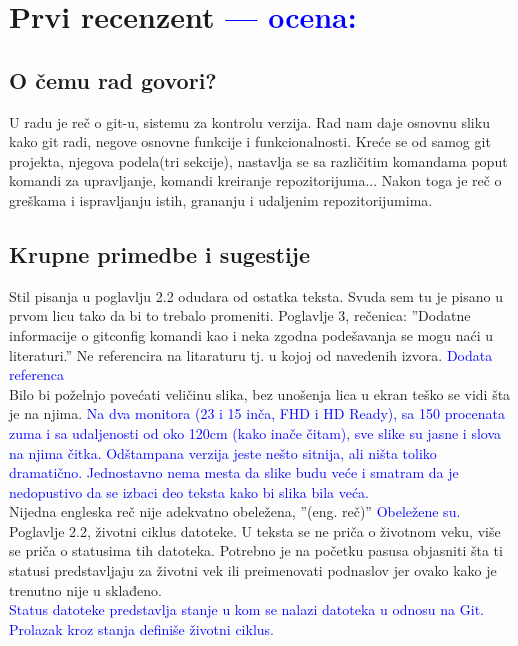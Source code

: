 \documentclass[a4paper]{report}
\newcommand{\odgovor}[1]{\textcolor{blue}{#1}}
\begin{document}
\chapter{Prvi recenzent \odgovor{--- ocena:} }

\section{O čemu rad govori?}
U radu je reč o git-u, sistemu za kontrolu verzija. Rad nam daje osnovnu sliku kako git radi, negove osnovne funkcije i funkcionalnosti. Kreće se od samog git projekta, njegova podela(tri sekcije),  nastavlja se sa različitim komandama poput komandi za upravljanje, komandi kreiranje repozitorijuma... Nakon toga je reč o greškama i ispravljanju istih, grananju i udaljenim repozitorijumima.

\section{Krupne primedbe i sugestije}
Stil pisanja u poglavlju 2.2 odudara od ostatka teksta. Svuda sem tu je pisano u prvom licu tako da bi to trebalo promeniti.\newline
Poglavlje 3, rečenica: ''Dodatne informacije o gitconfig komandi kao i neka zgodna podešavanja se mogu naći u literaturi.'' Ne referencira na litaraturu tj. u kojoj od navedenih izvora.\newline
\odgovor{Dodata referenca}\\
Bilo bi poželnjo povećati veličinu slika, bez unošenja lica u ekran teško se vidi šta je na njima.\newline
\odgovor{Na dva monitora (23 i 15 inča, FHD i HD Ready), sa 150 procenata zuma i sa udaljenosti od oko 120cm (kako inače čitam), sve slike su jasne i slova na njima čitka. Odštampana verzija jeste nešto sitnija, ali ništa toliko dramatično. Jednostavno nema mesta da slike budu veće i smatram da je nedopustivo da se izbaci deo teksta kako bi slika bila veća.}\\
Nijedna engleska reč nije adekvatno obeležena, ''(eng. reč)'' \newline
\odgovor{Obeležene su.}\\
Poglavlje 2.2, životni ciklus datoteke. U teksta se ne priča o životnom veku, više se priča o statusima tih datoteka. Potrebno je na početku pasusa objasniti šta ti statusi predstavljaju za životni vek ili preimenovati podnaslov jer ovako kako je trenutno nije u sklađeno.\\
\odgovor{Status datoteke predstavlja stanje u kom se nalazi datoteka u odnosu na Git. Prolazak kroz stanja definiše životni ciklus.}\\
\end{document}
